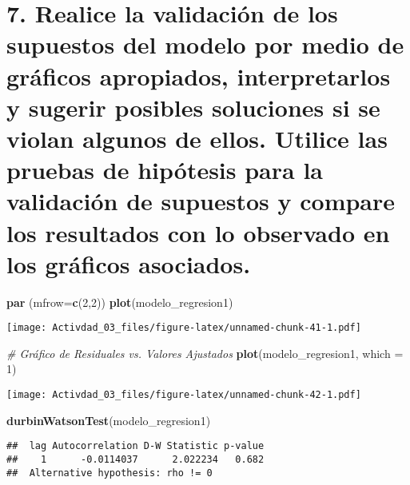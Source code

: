 \documentclass[
]{article}
\newenvironment{Shaded}{\begin{snugshade}}{\end{snugshade}}
\newcommand{\AttributeTok}[1]{\textcolor[rgb]{0.13,0.29,0.53}{#1}}
\newcommand{\CommentTok}[1]{\textcolor[rgb]{0.56,0.35,0.01}{\textit{#1}}}
\newcommand{\DecValTok}[1]{\textcolor[rgb]{0.00,0.00,0.81}{#1}}
\newcommand{\FunctionTok}[1]{\textcolor[rgb]{0.13,0.29,0.53}{\textbf{#1}}}
\newcommand{\NormalTok}[1]{#1}
\begin{document}
\section{\texorpdfstring{\textbf{7. Realice la validación de los
supuestos del modelo por medio de gráficos apropiados, interpretarlos y
sugerir posibles soluciones si se violan algunos de ellos. Utilice las
pruebas de hipótesis para la validación de supuestos y compare los
resultados con lo observado en los gráficos
asociados.}}{7. Realice la validación de los supuestos del modelo por medio de gráficos apropiados, interpretarlos y sugerir posibles soluciones si se violan algunos de ellos. Utilice las pruebas de hipótesis para la validación de supuestos y compare los resultados con lo observado en los gráficos asociados.}}\label{realice-la-validaciuxf3n-de-los-supuestos-del-modelo-por-medio-de-gruxe1ficos-apropiados-interpretarlos-y-sugerir-posibles-soluciones-si-se-violan-algunos-de-ellos.-utilice-las-pruebas-de-hipuxf3tesis-para-la-validaciuxf3n-de-supuestos-y-compare-los-resultados-con-lo-observado-en-los-gruxe1ficos-asociados.}

\begin{Shaded}
\begin{Highlighting}[]
\FunctionTok{par}\NormalTok{ (}\AttributeTok{mfrow=}\FunctionTok{c}\NormalTok{(}\DecValTok{2}\NormalTok{,}\DecValTok{2}\NormalTok{))}
\FunctionTok{plot}\NormalTok{(modelo\_regresion1)}
\end{Highlighting}
\end{Shaded}

\texttt{[image: Activdad\_03\_files/figure-latex/unnamed-chunk-41-1.pdf]}

\begin{Shaded}
\begin{Highlighting}[]
\CommentTok{\# Gráfico de Residuales vs. Valores Ajustados}
\FunctionTok{plot}\NormalTok{(modelo\_regresion1, }\AttributeTok{which =} \DecValTok{1}\NormalTok{)}
\end{Highlighting}
\end{Shaded}

\texttt{[image: Activdad\_03\_files/figure-latex/unnamed-chunk-42-1.pdf]}

\begin{Shaded}
\begin{Highlighting}[]
\FunctionTok{durbinWatsonTest}\NormalTok{(modelo\_regresion1)}
\end{Highlighting}
\end{Shaded}

\begin{verbatim}
##  lag Autocorrelation D-W Statistic p-value
##    1      -0.0114037      2.022234   0.682
##  Alternative hypothesis: rho != 0
\end{verbatim}
\end{document}

